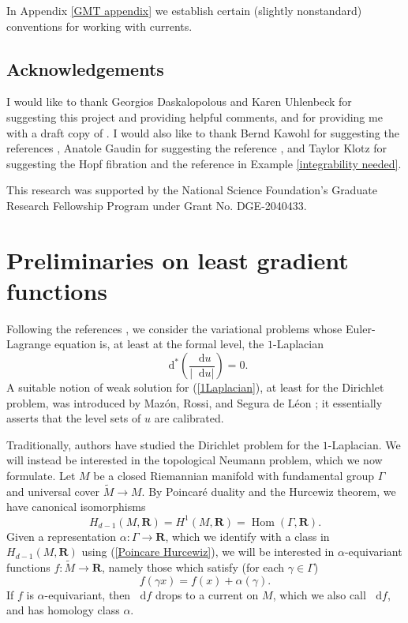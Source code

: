 \documentclass[reqno,11pt]{amsart}
\newcommand{\RR}{\mathbf{R}}
\newcommand*\dif{\mathop{}\!\mathrm{d}}
\DeclareMathOperator{\Hom}{Hom}
\theoremstyle{definition}
\numberwithin{equation}{section}
\begin{document}
In Appendix \ref{GMT appendix} we establish certain (slightly nonstandard) conventions for working with currents.

\subsection{Acknowledgements}
I would like to thank Georgios Daskalopolous and Karen Uhlenbeck for suggesting this project and providing helpful comments, and for providing me with a draft copy of \cite{daskalopoulos2023}.
I would also like to thank Bernd Kawohl for suggesting the references \cite{Kawohl2003, Grieser05}, Anatole Gaudin for suggesting the reference \cite{Costabel2010}, and Taylor Klotz for suggesting the Hopf fibration and the reference \cite{Peralta_Salas_2023} in Example \ref{integrability needed}.

This research was supported by the National Science Foundation's Graduate Research Fellowship Program under Grant No. DGE-2040433.

\section{Preliminaries on least gradient functions}\label{prevResults}
Following the references \cite{Mazon14, BackusCML}, we consider the variational problems whose Euler-Lagrange equation is, at least at the formal level, the $1$-Laplacian
\begin{equation}\label{1Laplacian}
\dif^*\left(\frac{\dif u}{|\dif u|}\right) = 0.
\end{equation}
A suitable notion of weak solution for (\ref{1Laplacian}), at least for the Dirichlet problem, was introduced by Maz\'on, Rossi, and Segura de L\'eon \cite{Mazon14}; it essentially asserts that the level sets of $u$ are calibrated.

Traditionally, authors have studied the Dirichlet problem for the $1$-Laplacian.
We will instead be interested in the topological Neumann problem, which we now formulate.
Let $M$ be a closed Riemannian manifold with fundamental group $\Gamma$ and universal cover $\tilde M \to M$.
By Poincar\'e duality and the Hurcewiz theorem, we have canonical isomorphisms
\begin{equation}\label{Poincare Hurcewiz}
H_{d - 1}(M, \RR) = H^1(M, \RR) = \Hom(\Gamma, \RR).
\end{equation}
Given a representation $\alpha: \Gamma \to \RR$, which we identify with a class in $H_{d - 1}(M, \RR)$ using (\ref{Poincare Hurcewiz}), we will be interested in $\alpha$-equivariant functions $f: \tilde M \to \RR$, namely those which satisfy (for each $\gamma \in \Gamma$)
$$f(\gamma x) = f(x) + \alpha(\gamma).$$
If $f$ is $\alpha$-equivariant, then $\dif f$ drops to a current on $M$, which we also call $\dif f$, and has homology class $\alpha$.
\end{document}
